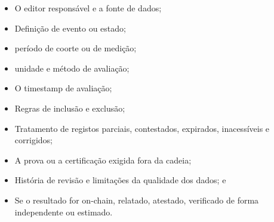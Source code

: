 \documentclass[11pt]{article}
\begin{document}
\begin{itemize}[leftmargin=*]
\item O editor responsável e a fonte de dados;
\item Definição de evento ou estado;
\item período de coorte ou de medição;
\item unidade e método de avaliação;
\item O timestamp de avaliação;
\item Regras de inclusão e exclusão;
\item Tratamento de registos parciais, contestados, expirados, inacessíveis e corrigidos;
\item A prova ou a certificação exigida fora da cadeia;
\item História de revisão e limitações da qualidade dos dados; e
\item Se o resultado for on-chain, relatado, atestado, verificado de forma independente ou estimado.
\end{itemize}
\end{document}
